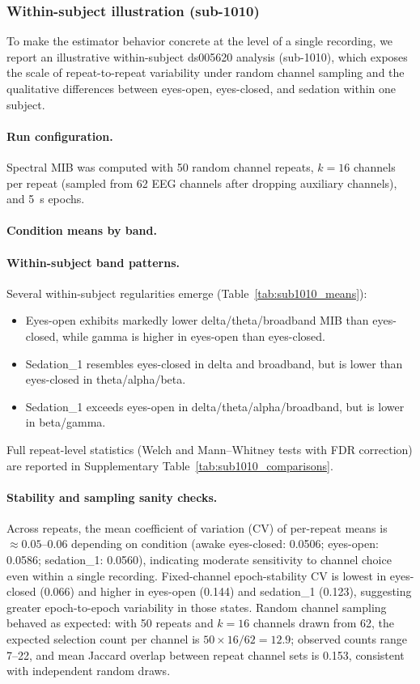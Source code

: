 \documentclass[11pt]{article}
\begin{document}
\subsubsection{Within-subject illustration (sub-1010)}
To make the estimator behavior concrete at the level of a single recording, we report an illustrative within-subject ds005620 analysis (sub-1010), which exposes the scale of repeat-to-repeat variability under random channel sampling and the qualitative differences between eyes-open, eyes-closed, and sedation within one subject.

\paragraph{Run configuration.}
Spectral MIB was computed with 50 random channel repeats, $k=16$ channels per repeat (sampled from 62 EEG channels after dropping auxiliary channels), and \SI{5}{s} epochs.

\paragraph{Condition means by band.}


\paragraph{Within-subject band patterns.}
Several within-subject regularities emerge (Table~\ref{tab:sub1010_means}):
\begin{itemize}[leftmargin=*]
    \item Eyes-open exhibits markedly lower delta/theta/broadband MIB than eyes-closed, while gamma is higher in eyes-open than eyes-closed.
    \item Sedation\_1 resembles eyes-closed in delta and broadband, but is lower than eyes-closed in theta/alpha/beta.
    \item Sedation\_1 exceeds eyes-open in delta/theta/alpha/broadband, but is lower in beta/gamma.
\end{itemize}
Full repeat-level statistics (Welch and Mann--Whitney tests with FDR correction) are reported in Supplementary Table~\ref{tab:sub1010_comparisons}.

\paragraph{Stability and sampling sanity checks.}
Across repeats, the mean coefficient of variation (CV) of per-repeat means is $\approx0.05$--$0.06$ depending on condition (awake eyes-closed: 0.0506; eyes-open: 0.0586; sedation\_1: 0.0560), indicating moderate sensitivity to channel choice even within a single recording. Fixed-channel epoch-stability CV is lowest in eyes-closed (0.066) and higher in eyes-open (0.144) and sedation\_1 (0.123), suggesting greater epoch-to-epoch variability in those states.
Random channel sampling behaved as expected: with 50 repeats and $k=16$ channels drawn from 62, the expected selection count per channel is $50\times16/62=12.9$; observed counts range 7--22, and mean Jaccard overlap between repeat channel sets is 0.153, consistent with independent random draws.
\end{document}
